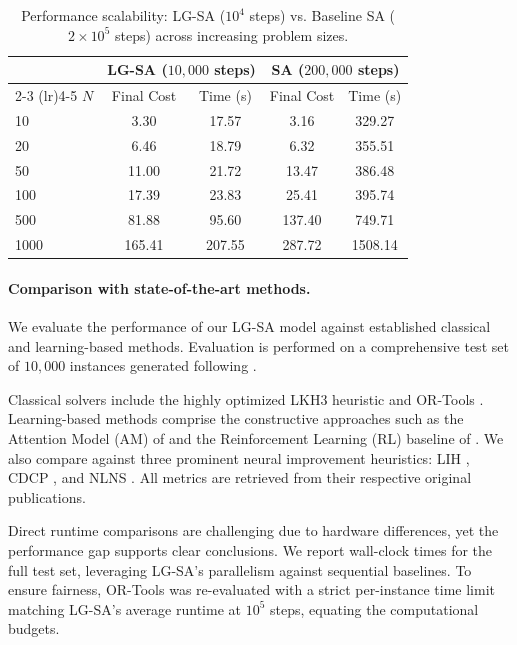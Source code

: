 \documentclass[letterpaper]{article} %
\begin{document}
\begin{table}[t]
\centering
\small
\begin{tabular}{lcccc}
\toprule
& \multicolumn{2}{c}{LG-SA ($10{,}000$ steps)} & \multicolumn{2}{c}{SA ($200{,}000$ steps)} \\
\cmidrule(lr){2-3} \cmidrule(lr){4-5}
$N$ & Final Cost & Time (s) & Final Cost &  Time (s) \\
\midrule
10 & 3.30 & 17.57 & 3.16 & 329.27 \\
20 & 6.46 & 18.79 & 6.32 & 355.51 \\
50 & 11.00 & 21.72 & 13.47 & 386.48 \\
100 & 17.39 & 23.83 & 25.41 & 395.74 \\
500 & 81.88 & 95.60 & 137.40 & 749.71 \\
1000 & 165.41 & 207.55 & 287.72 & 1508.14 \\
\bottomrule
\end{tabular}
\caption{Performance scalability: LG-SA ($10^4$ steps) vs. Baseline SA ($2 \times 10^5$ steps) across increasing problem sizes.}
\label{tab:scaling_results}
\end{table}



\paragraph{Comparison with state-of-the-art methods.}


We evaluate the performance of our LG-SA model against established classical and learning-based methods. Evaluation is performed on a comprehensive test set of $10{,}000$ instances generated following \citet{nazari_reinforcement_2018}.

Classical solvers include the highly optimized LKH3 heuristic \cite{helsgaun_extension_2017} and OR-Tools \cite{ortools_routing}. 
Learning-based methods comprise the constructive approaches such as the Attention Model (AM) of \citet{kool_attention_2019} and the Reinforcement Learning (RL) baseline of \citet{nazari_reinforcement_2018}. 
We also compare against three prominent neural improvement heuristics: LIH \citep{wu_learning_2022}, CDCP \citep{garcia-torres_combining_2022}, and NLNS \citep{hottung_neural_2022}. All metrics are retrieved from their respective original publications.

Direct runtime comparisons are challenging due to hardware differences, yet the performance gap supports clear conclusions. We report wall-clock times for the full test set, leveraging LG-SA's parallelism against sequential baselines. To ensure fairness, OR-Tools was re-evaluated with a strict per-instance time limit matching LG-SA's average runtime at $10^5$ steps, equating the computational budgets.
\end{document}
